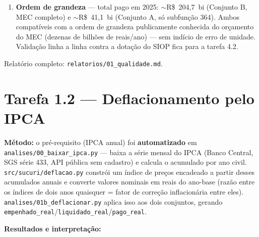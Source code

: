 \documentclass[11pt,a4paper]{article}
\begin{document}
\begin{enumerate}
    Conjunto A com \texttt{pago > empenhado} (2026, ação de
    regulação/supervisão de cursos: empenhado R\$~67, pago R\$~103.240) e
    nenhuma no Conjunto B. Amostra pequena demais para conclusão --- fica
    como candidata a checagem manual; nenhuma linha com valor negativo em
    nenhum dos conjuntos.
    \item \textbf{Ordem de grandeza} --- total pago em 2025:
    ${\sim}$R\$~204,7~bi (Conjunto B, MEC completo) e ${\sim}$R\$~41,1~bi
    (Conjunto A, só subfunção 364). Ambos compatíveis com a ordem de
    grandeza publicamente conhecida do orçamento do MEC (dezenas de
    bilhões de reais/ano) --- sem indício de erro de unidade. Validação
    linha a linha contra a dotação do SIOP fica para a tarefa 4.2.
\end{enumerate}

\noindent Relatório completo: \texttt{relatorios/01\_qualidade.md}.

\section{Tarefa 1.2 --- Deflacionamento pelo IPCA}

\textbf{Método:} o pré-requisito (IPCA anual) foi \textbf{automatizado} em
\texttt{analises/00\_baixar\_ipca.py} --- baixa a série mensal do IPCA
(Banco Central, SGS série 433, API pública sem cadastro) e calcula o
acumulado por ano civil. \texttt{src/sucuri/deflacao.py} constrói um
índice de preços encadeado a partir desses acumulados anuais e converte
valores nominais em reais do ano-base (razão entre os índices de dois anos
quaisquer = fator de correção inflacionária entre eles).
\texttt{analises/01b\_deflacionar.py} aplica isso aos dois conjuntos,
gerando \texttt{empenhado\_real}/\texttt{liquidado\_real}/\texttt{pago\_real}.

\textbf{Resultados e interpretação:}
\end{document}
